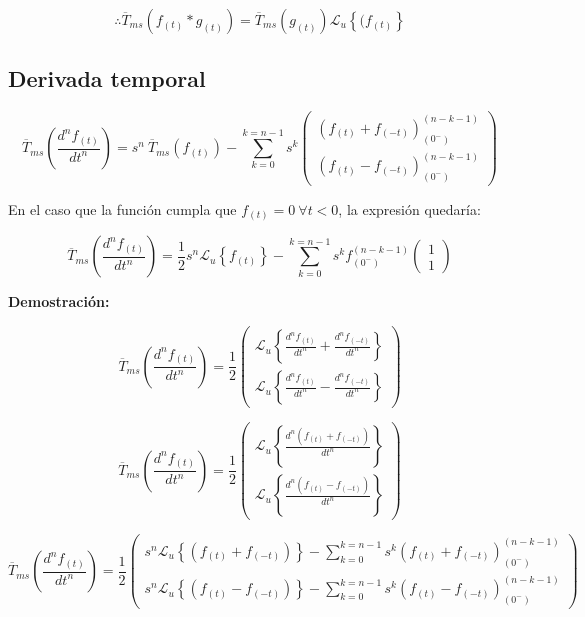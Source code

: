 \documentclass[12pt]{article}
\begin{document}
$$
\therefore \overline{T}_{ms}(f_{(t)} * g_{(t)}) =\overline{T}_{ms}( g_{(t)})  \mathcal{L}_u\left\{(f_{(t)} \right\}
$$


\subsection{Derivada temporal}

\begin{equation}\overline{T}_{ms}\left(\frac{d^n f_{(t)}}{dt^n}\right) =s^n\  \overline{T}_{ms}(f_{(t)})
- \sum\limits_{k=0}^{k=n-1} s^k
\begin{pmatrix}
 (f_{(t)} + f_{(-t)})^{(n-k-1)}_{(0^-)}\\[0.5 cm]
 (f_{(t)} - f_{(-t)})^{(n-k-1)}_{(0^-)}
\end{pmatrix}
\label{derivada}
\end{equation}

En el caso que la función cumpla que $f_{(t)} = 0 \ \forall t < 0$, la expresión quedaría:

$$\overline{T}_{ms}\left(\frac{d^n f_{(t)}}{dt^n}\right) = \frac12 s^n\mathcal{L}_u\left\{f_{(t)}\right\} -\sum\limits_{k=0}^{k=n-1} s^k f^{(n-k-1)}_{(0^-)}
\begin{pmatrix}
1\\
1
\end{pmatrix}
$$

{\bfseries Demostración:}

$$\overline{T}_{ms}\left(\frac{d^n f_{(t)}}{dt^n}\right) = \frac12
\begin{pmatrix}
\mathcal{L}_u\left\{\frac{d^n f_{(t)}}{dt^n} + \frac{d^n f_{(-t)}}{dt^n}\right\}\\[0.2 cm]
\mathcal{L}_u\left\{\frac{d^n f_{(t)}}{dt^n} - \frac{d^n f_{(-t)}}{dt^n}\right\}
\end{pmatrix}
$$

$$\overline{T}_{ms}\left(\frac{d^n f_{(t)}}{dt^n}\right) = \frac12
\begin{pmatrix}
\mathcal{L}_u\left\{\frac{d^n (f_{(t)} +f_{(-t)})}{dt^n}\right\}\\[0.2 cm]
\mathcal{L}_u\left\{\frac{d^n (f_{(t)}- f_{(-t)})}{dt^n}\right\}
\end{pmatrix}
$$

$$\overline{T}_{ms}\left(\frac{d^n f_{(t)}}{dt^n}\right) = \frac12
\begin{pmatrix}
s^n\mathcal{L}_u\left\{(f_{(t)} + f_{(-t)})\right\} -\sum\limits_{k=0}^{k=n-1} s^k (f_{(t)} + f_{(-t)})^{(n-k-1)}_{(0^-)}\\[0.5 cm]
s^n\mathcal{L}_u\left\{(f_{(t)} - f_{(-t)})\right\} -\sum\limits_{k=0}^{k=n-1} s^k (f_{(t)} - f_{(-t)})^{(n-k-1)}_{(0^-)}
\end{pmatrix}
$$
\end{document}
